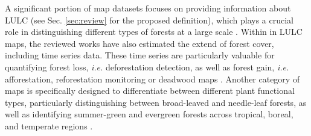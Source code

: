\documentclass{CUP-JNL-DTM}%
\theoremstyle{definition}
\numberwithin{equation}{section}
\begin{document}
A significant portion of map datasets focuses on providing information about LULC (see Sec. \ref{sec:review} for the proposed definition), which plays a crucial role in distinguishing different types of forests at a large scale \cite{bartholome_glc2000_2005, friedl_modis_2010, griffiths_forest_2014, pflugmacher_mapping_2019, thonfeld_long-term_2020, bonannella_forest_2022}.
%
Within in LULC maps, the reviewed works have also estimated the extend of forest cover, including time series data.
These time series are particularly valuable for quantifying forest loss, \textit{i.e.} deforestation detection, as well as forest gain, \textit{i.e.} afforestation, reforestation monitoring or deadwood maps \cite{hansen_high-resolution_2013, curtis_classifying_2018, verhegghen_mapping_2022, bunting_global_2022, schiefer_uav-based_2023}.
%
Another category of maps is specifically designed to differentiate between different plant functional types, particularly distinguishing between broad-leaved and needle-leaf forests, as well as identifying summer-green and evergreen forests across tropical, boreal, and temperate regions \cite{ottle_use_2013}.

\end{document}
